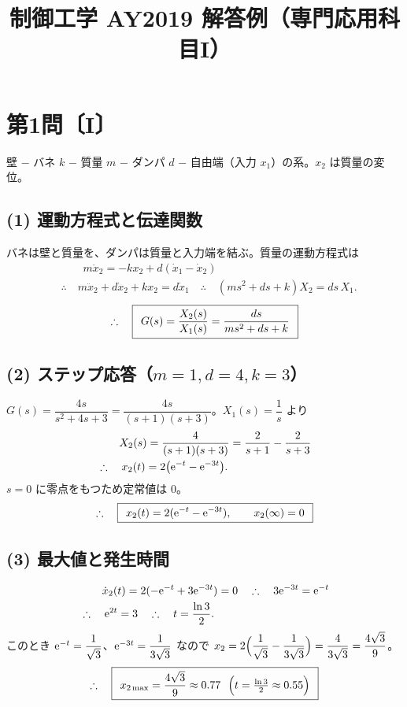 \documentclass[11pt,a4paper]{article}
\title{制御工学 AY2019 解答例（専門応用科目I）}
\author{}
\date{}
\begin{document}
\maketitle

\section*{第1問〔I〕}

壁 $-$ バネ $k$ $-$ 質量 $m$ $-$ ダンパ $d$ $-$ 自由端（入力 $x_1$）の系。$x_2$ は質量の変位。

\subsection*{(1) 運動方程式と伝達関数}
バネは壁と質量を、ダンパは質量と入力端を結ぶ。質量の運動方程式は
\begin{align*}
  &\qquad m\ddot{x}_2=-k x_2+d(\dot{x}_1-\dot{x}_2)\\
  &\therefore\quad m\ddot{x}_2+d\dot{x}_2+k x_2=d\dot{x}_1
   \quad\therefore\quad (ms^2+ds+k)X_2=ds\,X_1.
\end{align*}
\[
  \therefore\quad \boxed{\,\;G(s)=\dfrac{X_2(s)}{X_1(s)}=\dfrac{ds}{ms^2+ds+k}\;\,}
\]

\subsection*{(2) ステップ応答（$m=1,d=4,k=3$）}
$G(s)=\dfrac{4s}{s^2+4s+3}=\dfrac{4s}{(s+1)(s+3)}$。$X_1(s)=\dfrac1s$ より
\begin{align*}
  &\qquad X_2(s)=\frac{4}{(s+1)(s+3)}=\frac{2}{s+1}-\frac{2}{s+3}\\
  &\therefore\quad x_2(t)=2\bigl(\mathrm{e}^{-t}-\mathrm{e}^{-3t}\bigr).
\end{align*}
$s=0$ に零点をもつため定常値は $0$。
\[
  \therefore\quad \boxed{\,\;x_2(t)=2(\mathrm{e}^{-t}-\mathrm{e}^{-3t}),\qquad x_2(\infty)=0\;\,}
\]

\subsection*{(3) 最大値と発生時間}
\begin{align*}
  &\qquad \dot{x}_2(t)=2(-\mathrm{e}^{-t}+3\mathrm{e}^{-3t})=0
   \quad\therefore\quad 3\mathrm{e}^{-3t}=\mathrm{e}^{-t}\\
  &\therefore\quad \mathrm{e}^{2t}=3
   \quad\therefore\quad t=\frac{\ln3}{2}.
\end{align*}
このとき $\mathrm{e}^{-t}=\dfrac{1}{\sqrt3}$、$\mathrm{e}^{-3t}=\dfrac{1}{3\sqrt3}$ なので
$x_2=2\Bigl(\dfrac{1}{\sqrt3}-\dfrac{1}{3\sqrt3}\Bigr)=\dfrac{4}{3\sqrt3}=\dfrac{4\sqrt3}{9}$。
\[
  \therefore\quad \ans{\;x_{2\max}=\dfrac{4\sqrt3}{9}\approx0.77\ \ \Bigl(t=\tfrac{\ln3}{2}\approx0.55\Bigr)\;}
\]
\end{document}
